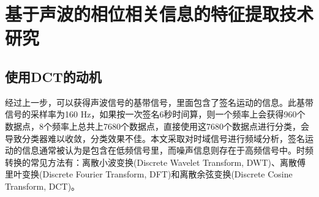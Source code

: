 \section{基于声波的相位相关信息的特征提取技术研究}
\subsection{使用DCT的动机}
经过上一步，可以获得声波信号的基带信号，里面包含了签名运动的信息。此基带信号的采样率为160 Hz，如果按一次签名6秒时间算，则一个频率上会获得960个数据点，8个频率上总共上7680个数据点，直接使用这7680个数据点进行分类，会导致分类器难以收敛，分类效果不佳。本文采取对时域信号进行频域分析，签名运动的信息通常被认为是包含在低频信号里，而噪声信息则存在于高频信号中。时频转换的常见方法有：离散小波变换(Discrete Wavelet Transform, DWT)、离散傅里叶变换(Discrete Fourier Transform, DFT)和离散余弦变换(Discrete Cosine Transform, DCT)。

